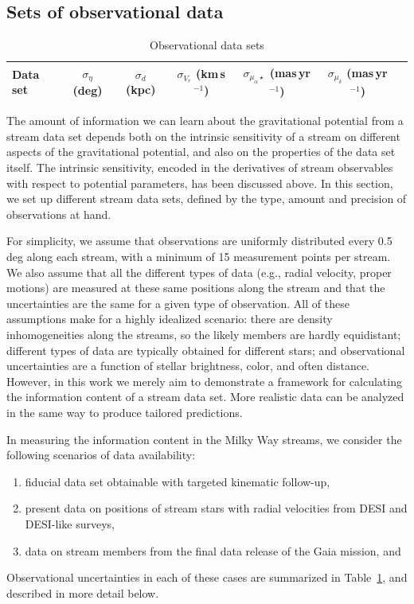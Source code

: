 \documentclass[modern]{aastex61}
\begin{document}
\subsection{Sets of observational data}
\label{sec:datasets}

\begin{table}
\begin{center}
\begin{tabular}{l c c c c c c}
\hline
\hline
Data set & $\sigma_\eta$ (deg) & $\sigma_d$ (kpc) & $\sigma_{V_r}$ (km\,s$^{-1}$) & $\sigma_{\mu_\alpha\star}$ (mas\,yr$^{-1}$) & $\sigma_{\mu_\delta}$ (mas\,yr$^{-1}$) \\
\hline

\hline
\hline
\end{tabular}
\caption{Observational data sets}
\label{t:datasets}
\end{center}
\end{table}

The amount of information we can learn about the gravitational potential from a stream data set depends both on the intrinsic sensitivity of a stream on different aspects of the gravitational potential, and also on the properties of the data set itself.
The intrinsic sensitivity, encoded in the derivatives of stream observables with respect to potential parameters, has been discussed above.
In this section, we set up different stream data sets, defined by the type, amount and precision of observations at hand.

For simplicity, we assume that observations are uniformly distributed every 0.5\,deg along each stream, with a minimum of 15 measurement points per stream.
We also assume that all the different types of data (e.g., radial velocity, proper motions) are measured at these same positions along the stream and that the uncertainties are the same for a given type of observation.
All of these assumptions make for a highly idealized scenario: there are density inhomogeneities along the streams, so the likely members are hardly equidistant; different types of data are typically obtained for different stars; and observational uncertainties are a function of stellar brightness, color, and often distance.
However, in this work we merely aim to demonstrate a framework for calculating the information content of a stream data set.
More realistic data can be analyzed in the same way to produce tailored predictions.

In measuring the information content in the Milky Way streams, we consider the following scenarios of data availability:
\begin{enumerate}
\item fiducial data set obtainable with targeted kinematic follow-up,
\item present data on positions of stream stars with radial velocities from DESI and DESI-like surveys,
\item data on stream members from the final data release of the Gaia mission, and
\end{enumerate}
Observational uncertainties in each of these cases are summarized in Table~\ref{t:datasets}, and described in more detail below.
\end{document}
